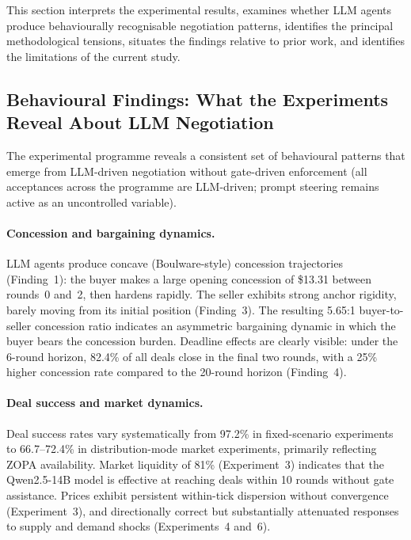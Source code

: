 
\label{sec:discussion}

This section interprets the experimental results, examines whether LLM agents produce behaviourally recognisable negotiation patterns, identifies the principal methodological tensions, situates the findings relative to prior work, and identifies the limitations of the current study.

\subsection{Behavioural Findings: What the Experiments Reveal About LLM Negotiation}
\label{sec:disc-positive}

The experimental programme reveals a consistent set of behavioural patterns that emerge from LLM-driven negotiation without gate-driven enforcement (all acceptances across the programme are LLM-driven; prompt steering remains active as an uncontrolled variable).

\paragraph{Concession and bargaining dynamics.}
LLM agents produce concave (Boulware-style) concession trajectories (Finding~1): the buyer makes a large opening concession of \$13.31 between rounds~0 and~2, then hardens rapidly.  The seller exhibits strong anchor rigidity, barely moving from its initial position (Finding~3).  The resulting 5.65:1 buyer-to-seller concession ratio indicates an asymmetric bargaining dynamic in which the buyer bears the concession burden.  Deadline effects are clearly visible: under the 6-round horizon, 82.4\% of all deals close in the final two rounds, with a 25\% higher concession rate compared to the 20-round horizon (Finding~4).

\paragraph{Deal success and market dynamics.}
Deal success rates vary systematically from 97.2\% in fixed-scenario experiments to 66.7--72.4\% in distribution-mode market experiments, primarily reflecting ZOPA availability.  Market liquidity of 81\% (Experiment~3) indicates that the Qwen2.5-14B model is effective at reaching deals within 10 rounds without gate assistance.  Prices exhibit persistent within-tick dispersion without convergence (Experiment~3), and directionally correct but substantially attenuated responses to supply and demand shocks (Experiments~4 and~6).

